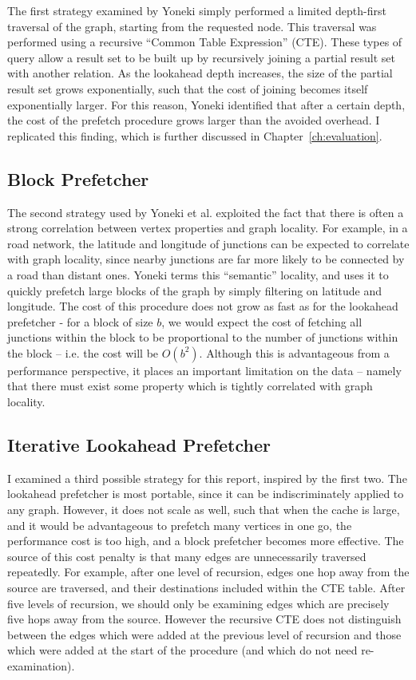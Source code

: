 The first strategy examined by Yoneki simply performed a limited depth-first
traversal of the graph, starting from the requested node. This traversal was
performed using a recursive ``Common Table Expression'' (CTE). These types of
query allow a result set to be built up by recursively joining a partial
result set with another relation. As the lookahead depth increases, the size
of the partial result set grows exponentially, such that the cost of joining
becomes itself exponentially larger. For this reason, Yoneki identified that
after a certain depth, the cost of the prefetch procedure grows larger than
the avoided overhead. I replicated this finding, which is further discussed in
Chapter~\ref{ch:evaluation}.



\subsection{Block Prefetcher}

The second strategy used by Yoneki et al. exploited the fact that there is
often a strong correlation between vertex properties and graph locality. For
example, in a road network, the latitude and longitude of junctions can be
expected to correlate with graph locality, since nearby junctions are far more
likely to be connected by a road than distant ones. Yoneki terms this
``semantic'' locality, and uses it to quickly prefetch large blocks of the
graph by simply filtering on latitude and longitude. The cost of this
procedure does not grow as fast as for the lookahead prefetcher - for a block
of size $b$,  we would expect the cost of fetching all junctions within the
block to be proportional to the number of junctions within the block -- i.e.
the cost will be $O(b^2)$. Although this is advantageous from a performance
perspective, it places an important limitation on the data -- namely that
there must exist some property which is tightly correlated with graph
locality.



\subsection{Iterative Lookahead Prefetcher}

I examined a third possible strategy for this report, inspired by the first
two.  The lookahead prefetcher is most portable, since it can be
indiscriminately applied to any graph. However, it does not scale as well,
such that when the cache is large, and it would be advantageous to prefetch
many vertices in one go, the performance cost is too high, and a block
prefetcher becomes more effective. The source of this cost penalty is that
many edges are unnecessarily traversed repeatedly. For example, after one
level of recursion, edges one hop away from the source are traversed, and
their destinations included within the CTE table. After five levels of
recursion, we should only be examining edges which are precisely five hops
away from the source. However the recursive CTE does not distinguish between
the edges which were added at the previous  level of recursion and those which
were added at the start of the procedure (and which do not need re-
examination).


